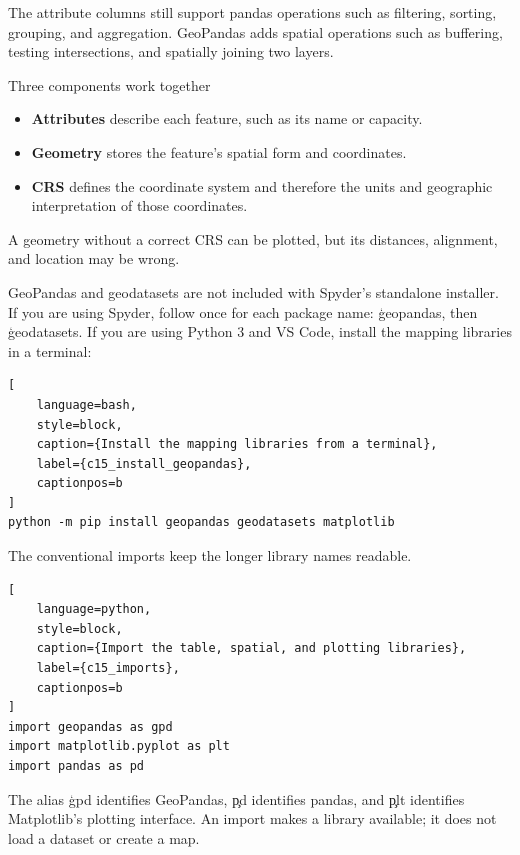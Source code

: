 The attribute columns still support pandas operations such as filtering,
sorting, grouping, and aggregation. GeoPandas adds spatial operations such as
buffering, testing intersections, and spatially joining two layers.

\begin{SyntaxBox}{Three components work together}
\begin{itemize}
    \item \textbf{Attributes} describe each feature, such as its name or capacity.
    \item \textbf{Geometry} stores the feature's spatial form and coordinates.
    \item \textbf{CRS} defines the coordinate system and therefore the units and
          geographic interpretation of those coordinates.
\end{itemize}
A geometry without a correct CRS can be plotted, but its distances, alignment,
and location may be wrong.
\end{SyntaxBox}


GeoPandas and geodatasets are not included with Spyder's standalone
installer. If you are using Spyder, follow
 once for
each package name: \c{geopandas}, then \c{geodatasets}. If you are using
Python 3 and VS Code, install the mapping libraries in a terminal:

\begin{lstlisting}[
    language=bash,
    style=block,
    caption={Install the mapping libraries from a terminal},
    label={c15_install_geopandas},
    captionpos=b
]
python -m pip install geopandas geodatasets matplotlib
\end{lstlisting}

The conventional imports keep the longer library names readable.

\begin{lstlisting}[
    language=python,
    style=block,
    caption={Import the table, spatial, and plotting libraries},
    label={c15_imports},
    captionpos=b
]
import geopandas as gpd
import matplotlib.pyplot as plt
import pandas as pd
\end{lstlisting}

The alias \c{gpd} identifies GeoPandas, \c{pd} identifies pandas, and \c{plt}
identifies Matplotlib's plotting interface. An import makes a library available;
it does not load a dataset or create a map.

